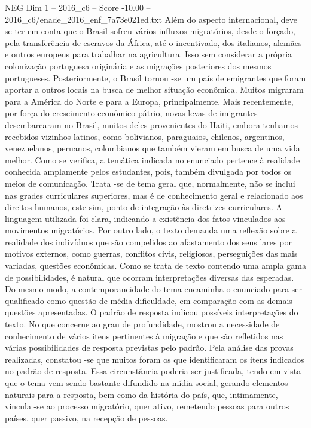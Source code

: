 \begin{textsample}{NEG Dim 1 – 2016\_c6 – Score -10.00 – 2016\_c6/enade\_2016\_enf\_7a73e021ed.txt}
Além do aspecto internacional, deve se ter em conta que o Brasil sofreu vários influxos migratórios, desde o forçado, pela transferência de escravos da África, até o incentivado, dos italianos, alemães e outros europeus para trabalhar na agricultura.
Isso sem considerar a própria colonização portuguesa originária e as migrações posteriores dos mesmos portugueses.
Posteriormente, o Brasil tornou -se um país de emigrantes que foram aportar a outros locais na busca de melhor situação econômica.
Muitos migraram para a América do Norte e para a Europa, principalmente.
Mais recentemente, por força do crescimento econômico pátrio, novas levas de imigrantes desembarcaram no Brasil, muitos deles provenientes do Haiti, embora tenhamos recebidos vizinhos latinos, como bolivianos, paraguaios, chilenos, argentinos, venezuelanos, peruanos, colombianos que também vieram em busca de uma vida melhor.
Como se verifica, a temática indicada no enunciado pertence à realidade conhecida amplamente pelos estudantes, pois, também divulgada por todos os meios de comunicação.
Trata -se de tema geral que, normalmente, não se inclui nas grades curriculares superiores, mas é de conhecimento geral e relacionado aos direitos humanos, este sim, ponto de integração às diretrizes curriculares.
A linguagem utilizada foi clara, indicando a existência dos fatos vinculados aos movimentos migratórios.
Por outro lado, o texto demanda uma reflexão sobre a realidade dos indivíduos que são compelidos ao afastamento dos seus lares por motivos externos, como guerras, conflitos civis, religiosos, perseguições das mais variadas, questões econômicas.
Como se trata de texto contendo uma ampla gama de possibilidades, é natural que ocorram interpretações diversas das esperadas.
Do mesmo modo, a contemporaneidade do tema encaminha o enunciado para ser qualificado como questão de média dificuldade, em comparação com as demais questões apresentadas.
O padrão de resposta indicou possíveis interpretações do texto.
No que concerne ao grau de profundidade, mostrou a necessidade de conhecimento de vários itens pertinentes à migração e que são refletidos nas várias possibilidades de resposta previstas pelo padrão.
Pela análise das provas realizadas, constatou -se que muitos foram os que identificaram os itens indicados no padrão de resposta.
Essa circunstância poderia ser justificada, tendo em vista que o tema vem sendo bastante difundido na mídia social, gerando elementos naturais para a resposta, bem como da história do país, que, intimamente, vincula -se ao processo migratório, quer ativo, remetendo pessoas para outros países, quer passivo, na recepção de pessoas.

\end{textsample}
